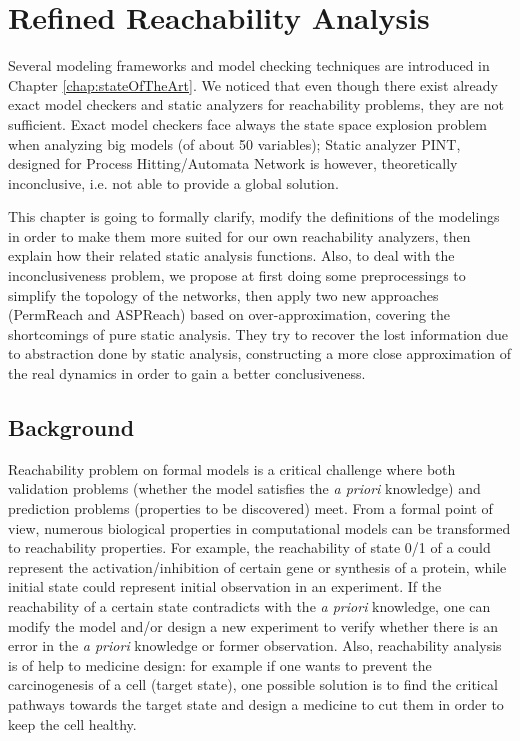 \chapter{Refined Reachability Analysis}
\begin{mybox}
Several modeling frameworks and model checking techniques are introduced in Chapter \ref{chap:stateOfTheArt}.
We noticed that even though there exist already exact model checkers and static analyzers for reachability problems, they are not sufficient.
Exact model checkers face always the state space explosion problem when analyzing big models (of about 50 variables);
Static analyzer PINT, designed for Process Hitting/Automata Network is however, theoretically inconclusive, i.e. not able to provide a global solution.

This chapter is going to formally clarify, modify the definitions of the modelings in order to make them more suited for our own reachability analyzers, then explain how their related static analysis functions.
Also, to deal with the inconclusiveness problem, we propose at first doing some preprocessings to simplify the topology of the networks, then apply two new approaches (PermReach and ASPReach) based on over-approximation, covering the shortcomings of pure static analysis.
They try to recover the lost information due to abstraction done by static analysis, constructing a more close approximation of the real dynamics in order to gain a better conclusiveness.
\end{mybox}

\section{Background}
Reachability problem on formal models is a critical challenge where both validation problems (whether the model satisfies the \textit{a priori} knowledge) and prediction problems (properties to be discovered) meet. 
From a formal point of view, numerous biological properties in computational models can be transformed to reachability properties. 
For example, the reachability of state 0/1 of a could represent the activation/inhibition of certain gene or synthesis of a protein, while initial state could represent initial observation in an experiment.
If the reachability of a certain state contradicts with the \textit{a priori} knowledge, one can modify the model and/or design a new experiment to verify whether there is an error in the \textit{a priori} knowledge or former observation. 
Also, reachability analysis is of help to medicine design: for example if one wants to prevent the carcinogenesis of a cell (target state), one possible solution is to find the critical pathways towards the target state and design a medicine to cut them in order to keep the cell healthy.


